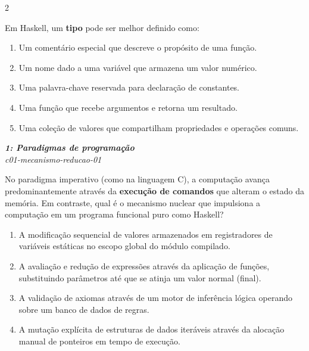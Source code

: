 \documentclass[a4paper,10pt,brazil]{article}
\begin{document}
\begin{multicols}{2}
\begin{flushright}
\end{flushright}
Em Haskell, um \textbf{tipo} pode ser melhor definido como:

\begin{enumerate}
  \item Um comentário especial que descreve o propósito de uma função.

  \item Um nome dado a uma variável que armazena um valor numérico.

  \item Uma palavra-chave reservada para declaração de constantes.

  \item Uma função que recebe argumentos e retorna um resultado.

  \item Uma coleção de valores que compartilham propriedades e operações comuns.


\end{enumerate}

\begin{flushright}
  \footnotesize
  \textit{\textbf{1: Paradigmas de programação}}\\
  \textit{c01-mecanismo-reducao-01}\\

\end{flushright}
No paradigma imperativo (como na linguagem C), a computação avança predominantemente através da \textbf{execução de comandos} que alteram o estado da memória. Em contraste, qual é o mecanismo nuclear que impulsiona a computação em um programa funcional puro como Haskell?

\begin{enumerate}
  \item A modificação sequencial de valores armazenados em registradores de variáveis estáticas no escopo global do módulo compilado.

  \item A avaliação e redução de expressões através da aplicação de funções, substituindo parâmetros até que se atinja um valor normal (final).

  \item A validação de axiomas através de um motor de inferência lógica operando sobre um banco de dados de regras.

  \item A mutação explícita de estruturas de dados iteráveis através da alocação manual de ponteiros em tempo de execução.


\end{enumerate}
\end{multicols}
\end{document}
